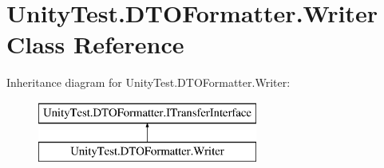 \hypertarget{class_unity_test_1_1_d_t_o_formatter_1_1_writer}{}\section{Unity\+Test.\+D\+T\+O\+Formatter.\+Writer Class Reference}
\label{class_unity_test_1_1_d_t_o_formatter_1_1_writer}
Inheritance diagram for Unity\+Test.\+D\+T\+O\+Formatter.\+Writer\+:\begin{figure}[H]
\begin{center}
\leavevmode
\includegraphics[height=2.000000cm]{class_unity_test_1_1_d_t_o_formatter_1_1_writer}
\end{center}
\end{figure}

